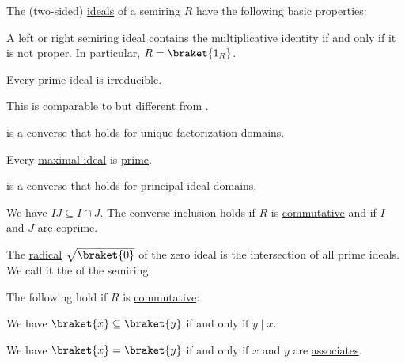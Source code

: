 \begin{proposition}\label{thm:def:semiring_ideal/properties}
  The (two-sided) \hyperref[def:semiring_ideal]{ideals} of a semiring \( R \) have the following basic properties:
  \begin{thmenum}[series=thm:def:semiring_ideal/properties]
     A left or right \hyperref[def:semiring_ideal]{semiring ideal} contains the multiplicative identity if and only if it is not proper. In particular, \( R = \braket{ 1_R } \).

     Every \hyperref[def:semiring_ideal/maximal]{prime ideal} is \hyperref[def:semiring_ideal/irreducible]{irreducible}.

    This is comparable to but different from .

     is a converse that holds for \hyperref[def:unique_factorization_domain]{unique factorization domains}.

     Every \hyperref[def:semiring_ideal/maximal]{maximal ideal} is \hyperref[def:semiring_ideal/prime]{prime}.

     is a converse that holds for \hyperref[def:principal_ideal_domain]{principal ideal domains}.

     We have \( IJ \subseteq I \cap J \). The converse inclusion holds if \( R \) is \hyperref[def:semiring/commutative]{commutative} and if \( I \) and \( J \) are \hyperref[def:semiring_ideal/coprime]{coprime}.

     The \hyperref[def:semiring_ideal/radical]{radical} \( \sqrt {\braket{ 0 }} \) of the zero ideal is the intersection of all prime ideals. We call it the  of the semiring.
  \end{thmenum}

  The following hold if \( R \) is \hyperref[def:semiring/commutative]{commutative}:
  \begin{thmenum}[series=thm:def:semiring_ideal/properties]
     We have \( \braket{ x } \subseteq \braket{ y } \) if and only if \( y \mid x \).

     We have \( \braket{ x } = \braket{ y } \) if and only if \( x \) and \( y \) are \hyperref[def:divisibility/associates]{associates}.


\end{thmenum}
\end{proposition}
